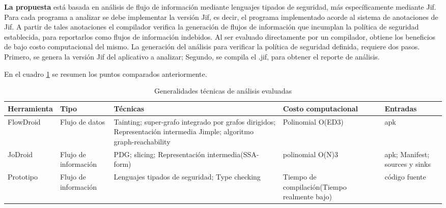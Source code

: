 \textbf{La propuesta} está basada en análisis de flujo de información mediante
lenguajes tipados de seguridad, más específicamente mediante Jif.\newline
Para cada programa a analizar se debe implementar la versión Jif, es decir,
el programa implementado acorde al sistema de anotaciones de Jif. A
partir de tales anotaciones el compilador verifica la generación de flujos de
información que incumplan la política de seguridad establecida, para reportarlos
como flujos de información indebidos. 
Al ser evaluado directamente por un
compilador, obtiene los beneficios de bajo costo computacional del mismo.\newline
La generación del análisis para verificar la política de seguridad
definida, requiere dos pasos. Primero, se genera la versión Jif del aplicativo a
analizar; Segundo, se compila el .jif, para obtener el reporte de análisis.

En el cuadro \ref{tab:comparacion} se resumen los puntos comparados
anteriormente.
\begin{table}[H]
\begin{center}
\small\addtolength{\tabcolsep}{-3pt}
\begin{tabular}{|p{}|p{}|p{5cm}|p{2cm}|p{2cm}|}
	\hline
	\textbf{Herramienta} & \textbf{Tipo} & \textbf{Técnicas} & \textbf{Costo
	computacional} & \textbf{ Entradas} \\
	\hline
	FlowDroid & Flujo de datos & 
	Tainting; super-grafo integrado por grafos dirigidos; Representación intermedia
	Jimple; algoritmo graph-reachability & Polinomial
	O(ED3)\cite{Graph-reachability} & apk\\
	\hline
	JoDroid & Flujo de información & PDG; slicing; Representación intermedia(SSA-
	form) & polinomial O(N)3\cite{FCO-PDG} & apk; Manifest; sources y sinks
	\\
	\hline
	Prototipo & Flujo de información  & Lenguajes tipados de seguridad; Type
	checking & Tiempo de compilación(Tiempo realmente bajo) & código fuente
	\\
	\hline
\end{tabular}
\end{center}
\caption{Generalidades técnicas de análisis evaluadas}
\label{tab:comparacion}
\end{table}	
